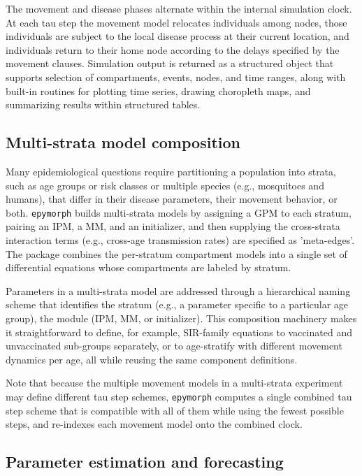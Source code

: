The movement and disease phases alternate within the internal simulation clock. 
At each tau step the movement model relocates individuals among nodes, those individuals are subject to the local disease process at their current location, and individuals return to their home node according to the delays specified by the movement clauses.
Simulation output is returned as a structured object that supports selection of compartments, events, nodes, and time ranges, along with built-in routines for plotting time series, drawing choropleth maps, and summarizing results within structured tables.

\subsection{Multi-strata model composition}
Many epidemiological questions require partitioning a population into strata, such as age groups or risk classes or multiple species (e.g., mosquitoes and humans), that differ in their disease parameters, their movement behavior, or both. 
\texttt{epymorph} builds multi-strata models by assigning a GPM to each stratum, pairing an IPM, a MM, and an initializer, and then supplying the cross-strata interaction terms (e.g., cross-age transmission rates) are specified as 'meta-edges'. 
The package combines the per-stratum compartment models into a single set of differential equations whose compartments are labeled by stratum.

Parameters in a multi-strata model are addressed through a hierarchical naming scheme that identifies the stratum (e.g., a parameter specific to a particular age group), the module (IPM, MM, or initializer).
This composition machinery makes it straightforward to define, for example, SIR-family equations to vaccinated and unvaccinated sub-groups separately, or to age-stratify with different movement dynamics per age, all while reusing the same component definitions.

Note that because the multiple movement models in a multi-strata experiment may define different tau step schemes, \texttt{epymorph} computes a single combined tau step scheme that is compatible with all of them while using the fewest possible steps, and re-indexes each movement model onto the combined clock.

\subsection{Parameter estimation and forecasting}

